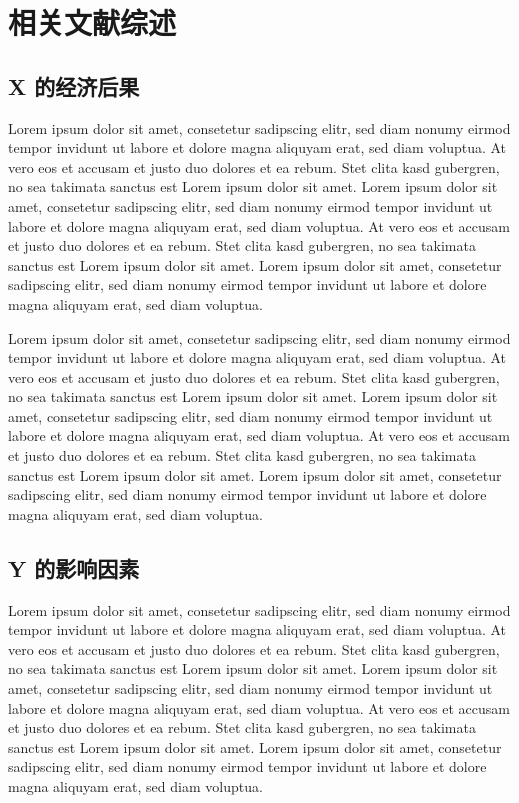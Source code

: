 \documentclass[]{WTUthesis}
\begin{document}
	\section{相关文献综述}	
	
	\subsection{X 的经济后果}
	
	Lorem ipsum dolor sit amet, consetetur sadipscing elitr, sed diam nonumy eirmod tempor invidunt ut labore et dolore magna aliquyam erat, sed diam voluptua. At vero eos et accusam et justo duo dolores et ea rebum. Stet clita kasd gubergren, no sea takimata sanctus est Lorem ipsum dolor sit amet. Lorem ipsum dolor sit amet, consetetur sadipscing elitr, sed diam nonumy eirmod tempor invidunt ut labore et dolore magna aliquyam erat, sed diam voluptua. At vero eos et accusam et justo duo dolores et ea rebum. Stet clita kasd gubergren, no sea takimata sanctus est Lorem ipsum dolor sit amet. Lorem ipsum dolor sit amet, consetetur sadipscing elitr, sed diam nonumy eirmod tempor invidunt ut labore et dolore magna aliquyam erat, sed diam voluptua.
	
	Lorem ipsum dolor sit amet, consetetur sadipscing elitr, sed diam nonumy eirmod tempor invidunt ut labore et dolore magna aliquyam erat, sed diam voluptua. At vero eos et accusam et justo duo dolores et ea rebum. Stet clita kasd gubergren, no sea takimata sanctus est Lorem ipsum dolor sit amet. Lorem ipsum dolor sit amet, consetetur sadipscing elitr, sed diam nonumy eirmod tempor invidunt ut labore et dolore magna aliquyam erat, sed diam voluptua. At vero eos et accusam et justo duo dolores et ea rebum. Stet clita kasd gubergren, no sea takimata sanctus est Lorem ipsum dolor sit amet. Lorem ipsum dolor sit amet, consetetur sadipscing elitr, sed diam nonumy eirmod tempor invidunt ut labore et dolore magna aliquyam erat, sed diam voluptua.
	
	\subsection{Y 的影响因素}
	
	Lorem ipsum dolor sit amet, consetetur sadipscing elitr, sed diam nonumy eirmod tempor invidunt ut labore et dolore magna aliquyam erat, sed diam voluptua. At vero eos et accusam et justo duo dolores et ea rebum. Stet clita kasd gubergren, no sea takimata sanctus est Lorem ipsum dolor sit amet. Lorem ipsum dolor sit amet, consetetur sadipscing elitr, sed diam nonumy eirmod tempor invidunt ut labore et dolore magna aliquyam erat, sed diam voluptua. At vero eos et accusam et justo duo dolores et ea rebum. Stet clita kasd gubergren, no sea takimata sanctus est Lorem ipsum dolor sit amet. Lorem ipsum dolor sit amet, consetetur sadipscing elitr, sed diam nonumy eirmod tempor invidunt ut labore et dolore magna aliquyam erat, sed diam voluptua.
	
\end{document}
